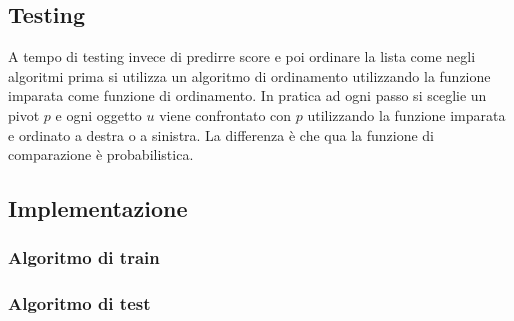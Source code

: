 	\subsection{Testing}
	A tempo di testing invece di predirre score e poi ordinare la lista come negli algoritmi prima si utilizza un algoritmo di ordinamento utilizzando la funzione imparata come funzione di ordinamento.
	In pratica ad ogni passo si sceglie un pivot $p$ e ogni oggetto $u$ viene confrontato con $p$ utilizzando la funzione imparata e ordinato a destra o a sinistra.
	La differenza \`e che qua la funzione di comparazione \`e probabilistica.

	\subsection{Implementazione}

		\subsubsection{Algoritmo di train}
		

		\subsubsection{Algoritmo di test}
		

